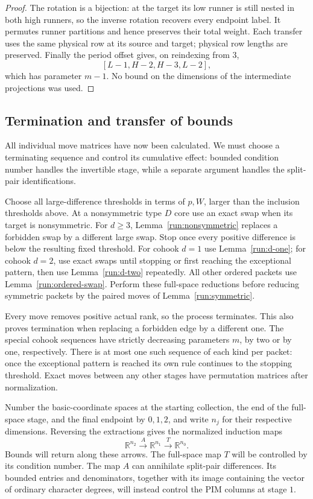 \begin{proof}
The rotation is a bijection: at the target its low runner
is still nested in both high runners, so the inverse rotation
recovers every endpoint label.  It permutes runner
partitions and hence preserves their total weight.  Each
transfer uses the same physical row at its source and
target; physical row lengths are preserved.
Finally the period offset gives, on reindexing from \(3\),
\[
 [L-1,H-2,H-3,L-2],
 \]
which has parameter \(m-1\).  No bound on the dimensions of
the intermediate projections was used.
\end{proof}

\subsection{Termination and transfer of bounds}

All individual move matrices have now been calculated.  We must
choose a terminating sequence and control its cumulative effect:
bounded condition number handles the invertible stage, while a
separate argument handles the split-pair identifications.

Choose all large-difference thresholds in terms of \(p,W\),
larger than the inclusion thresholds above.  At a nonsymmetric
type \(D\) core use an exact swap when its target is nonsymmetric.
For \(d\geq3\), Lemma~\ref{run:nonsymmetric} replaces a forbidden
swap by a different large swap.  Stop once every positive
difference is below the resulting fixed threshold.
For cohook \(d=1\) use Lemma~\ref{run:d-one}; for cohook \(d=2\),
use exact swaps until stopping or first reaching the exceptional
pattern, then use Lemma~\ref{run:d-two} repeatedly.
All other ordered packets use Lemma~\ref{run:ordered-swap}.
Perform these full-space reductions before reducing symmetric
packets by the paired moves of Lemma~\ref{run:symmetric}.

Every move removes positive actual rank, so the process terminates.
This also proves termination when replacing a forbidden edge
by a different one.  The special cohook sequences have strictly
decreasing parameters \(m\), by two or by one, respectively.
There is at most one such sequence of each kind per packet:
once the exceptional pattern is reached its own rule continues
to the stopping threshold.  Exact moves between any other
stages have permutation matrices after normalization.

Number the basic-coordinate spaces at the starting collection,
the end of the full-space stage, and the final endpoint by
\(0,1,2\), and write \(n_j\) for their respective dimensions.
Reversing the extractions gives the normalized induction maps
\[
 \mathbb R^{n_2}\xrightarrow{\ A\ }\mathbb R^{n_1}
              \xrightarrow{\ T\ }\mathbb R^{n_0}.
\]
Bounds will return along these arrows.  The full-space map \(T\)
will be controlled by its condition number.  The map \(A\) can
annihilate split-pair differences.  Its bounded entries and
denominators, together with its image containing the vector of
ordinary character degrees, will instead control the PIM columns
at stage \(1\).

